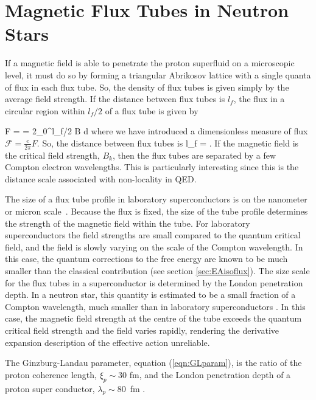 \section{Magnetic Flux Tubes in Neutron Stars}


If a magnetic field is able to penetrate the proton superfluid on a microscopic level,
it must do so by forming a triangular Abrikosov 
lattice with a single quanta of flux in each flux tube. So, the 
density of flux tubes is given simply by the average field strength.
If the distance between flux tubes is $l_f$, the flux in a circular 
region within $l_f/2$ of a flux tube is given by 

\be
	F =  = 2\pi \int_0^{l_f/2} B \rho d\rho
\ee
where we have introduced a dimensionless measure of flux 
$\mathcal{F} = \frac{e}{2\pi}F$.
So, the distance between flux tubes is
\be
	l_f = .
\ee
If the magnetic field is the critical field strength, $B_k$, then 
the flux tubes are separated by a few Compton electron wavelengths.
This is particularly interesting since this is the distance scale 
associated with non-locality in \ac{QED}.

The size of a flux tube profile in laboratory superconductors is 
on the nanometer or micron scale~\cite{poole2007superconductivity}. Because the flux 
is fixed, the size of the tube profile determines the strength of the magnetic field 
within the tube. For laboratory superconductors
the field strengths are small compared to the quantum critical field, and the field is slowly 
varying on the scale of the Compton wavelength.  In this case, the quantum corrections to the 
free energy are known to be much smaller than the classical contribution 
(see section \ref{sec:EAisoflux}).
The size scale for the flux tubes in a superconductor is determined by the London penetration depth. 
In a neutron star, this quantity is estimated to be a small fraction of a 
Compton wavelength, much smaller than in laboratory superconductors
\cite{lrr-2008-10, PhysRevLett.91.101101}. In this case, 
the magnetic field strength at the centre of the 
tube exceeds the quantum critical field strength and the field varies rapidly, 
rendering the derivative expansion description of the effective action unreliable.

The Ginzburg-Landau parameter, equation (\ref{eqn:GLparam}), is the 
ratio of the proton coherence length, $\xi_p \sim 30$ fm, and the 
London penetration depth of a proton super conductor, $\lambda_p \sim 80$~fm
\cite{PhysRevLett.91.101101}. 

